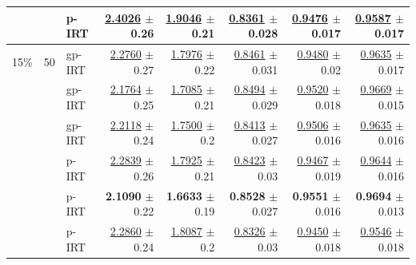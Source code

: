 \begin{longtable}{llp{}rrrrr}
 &  & p-IRT & \underline{2.4026} {\scriptsize $\pm$ 0.26} & \underline{1.9046} {\scriptsize $\pm$ 0.21} & \underline{0.8361} {\scriptsize $\pm$ 0.028} & \underline{0.9476} {\scriptsize $\pm$ 0.017} & \underline{0.9587} {\scriptsize $\pm$ 0.017} \\
\midrule
15\% & 50 & gp-IRT & \underline{2.2760} {\scriptsize $\pm$ 0.27} & \underline{1.7976} {\scriptsize $\pm$ 0.22} & \underline{0.8461} {\scriptsize $\pm$ 0.031} & \underline{0.9480} {\scriptsize $\pm$ 0.02} & \underline{0.9635} {\scriptsize $\pm$ 0.017} \\
 &  & gp-IRT & \underline{2.1764} {\scriptsize $\pm$ 0.25} & \underline{1.7085} {\scriptsize $\pm$ 0.21} & \underline{0.8494} {\scriptsize $\pm$ 0.029} & \underline{0.9520} {\scriptsize $\pm$ 0.018} & \underline{0.9669} {\scriptsize $\pm$ 0.015} \\
 &  & gp-IRT & \underline{2.2118} {\scriptsize $\pm$ 0.24} & \underline{1.7500} {\scriptsize $\pm$ 0.2} & \underline{0.8413} {\scriptsize $\pm$ 0.027} & \underline{0.9506} {\scriptsize $\pm$ 0.016} & \underline{0.9635} {\scriptsize $\pm$ 0.016} \\
 &  & p-IRT & \underline{2.2839} {\scriptsize $\pm$ 0.26} & \underline{1.7925} {\scriptsize $\pm$ 0.21} & \underline{0.8423} {\scriptsize $\pm$ 0.03} & \underline{0.9467} {\scriptsize $\pm$ 0.019} & \underline{0.9644} {\scriptsize $\pm$ 0.016} \\
 &  & p-IRT & \textbf{2.1090} {\scriptsize $\pm$ 0.22} & \textbf{1.6633} {\scriptsize $\pm$ 0.19} & \textbf{0.8528} {\scriptsize $\pm$ 0.027} & \textbf{0.9551} {\scriptsize $\pm$ 0.016} & \textbf{0.9694} {\scriptsize $\pm$ 0.013} \\
 &  & p-IRT & \underline{2.2860} {\scriptsize $\pm$ 0.24} & \underline{1.8087} {\scriptsize $\pm$ 0.2} & \underline{0.8326} {\scriptsize $\pm$ 0.03} & \underline{0.9450} {\scriptsize $\pm$ 0.018} & \underline{0.9546} {\scriptsize $\pm$ 0.018} \\
\end{longtable}